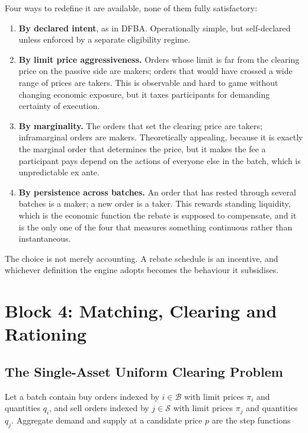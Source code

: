 Four ways to redefine it are available, none of them fully
satisfactory:

\begin{enumerate}
  \item \textbf{By declared intent}, as in DFBA. Operationally simple,
  but self-declared unless enforced by a separate eligibility regime.
  \item \textbf{By limit price aggressiveness.} Orders whose limit is
  far from the clearing price on the passive side are makers; orders
  that would have crossed a wide range of prices are takers. This is
  observable and hard to game without changing economic exposure, but it
  taxes participants for demanding certainty of execution.
  \item \textbf{By marginality.} The orders that set the clearing price
  are takers; inframarginal orders are makers. Theoretically appealing,
  because it is exactly the marginal order that determines the price,
  but it makes the fee a participant pays depend on the actions of
  everyone else in the batch, which is unpredictable ex ante.
  \item \textbf{By persistence across batches.} An order that has rested
  through several batches is a maker; a new order is a taker. This
  rewards standing liquidity, which is the economic function the rebate
  is supposed to compensate, and it is the only one of the four that
  measures something continuous rather than instantaneous.
\end{enumerate}

The choice is not merely accounting. A rebate schedule is an incentive,
and whichever definition the engine adopts becomes the behaviour it
subsidises.

\section{Block 4: Matching, Clearing and Rationing}
\label{sec:clearing}

\subsection{The Single-Asset Uniform Clearing Problem}

Let a batch contain buy orders indexed by $i \in \mathcal{B}$ with limit
prices $\pi_i$ and quantities $q_i$, and sell orders indexed by
$j \in \mathcal{S}$ with limit prices $\pi_j$ and quantities $q_j$.
Aggregate demand and supply at a candidate price $p$ are the step
functions

